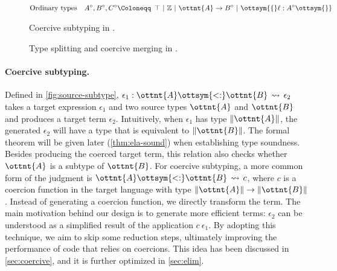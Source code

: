 \begin{figure}[t]
  \small
  \begin{align*}
    &\text{Ordinary types} &A^\circ, B^\circ, C^\circ\Coloneqq&~\,  \top  ~|~  \mathbb{Z}  ~|~ \ottnt{A}  \rightarrow  B^\circ  ~|~ \ottsym{\{}  \ell  :  A^\circ  \ottsym{\}} \\
  \end{align*}
  \ottdefnsCoSubtyping
  \caption{Coercive subtyping in \lambdaiplus.}\label{fig:source-subtype}
\end{figure}

\begin{figure}
  \small
  \ottdefnsSplitType
  \ottdefnsCoMerge
  \caption{Type splitting and coercive merging in \lambdaiplus.}\label{fig:source-split}
\end{figure}

\paragraph{Coercive subtyping.}
Defined in \autoref{fig:source-subtype}, $\epsilon_{{\mathrm{1}}}  :  \ottnt{A}  \ottsym{<:}  \ottnt{B}  \,\rightsquigarrow\,  \epsilon_{{\mathrm{2}}}$ takes a target
expression $\epsilon_{{\mathrm{1}}}$ and two source types $\ottnt{A}$ and $\ottnt{B}$ and produces a
target term $\epsilon_{{\mathrm{2}}}$. Intuitively, when $\epsilon_{{\mathrm{1}}}$ has type $\|  \ottnt{A}  \|$, the
generated $\epsilon_{{\mathrm{2}}}$ will have a type that is equivalent to $\|  \ottnt{B}  \|$. The
formal theorem will be given later (\autoref{thm:ela-sound}) when establishing
type soundness. Besides producing the coerced target term, this relation also
checks whether $\ottnt{A}$ is a subtype of $\ottnt{B}$. For coercive subtyping, a more
common form of the judgment is $ \ottnt{A}   \ottsym{<:}   \ottnt{B}   \,\rightsquigarrow\,  c $, where $c$ is a coercion function
in the target language with type $\|  \ottnt{A}  \|  \rightarrow  \|  \ottnt{B}  \|$. Instead of generating a
coercion function, we directly transform the term. The main motivation behind
our design is to generate more efficient terms: $\epsilon_{{\mathrm{2}}}$ can be understood as a
simplified result of the application $c~\epsilon_{{\mathrm{1}}}$. By adopting this technique, we
aim to skip some reduction steps, ultimately improving the performance of code
that relies on coercions. This idea has been discussed in
\autoref{sec:coercive}, and it is further optimized in \autoref{sec:elim}.

